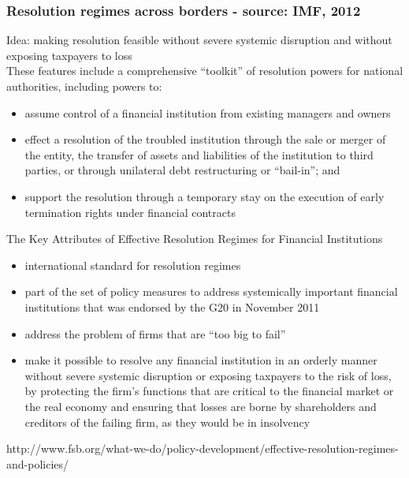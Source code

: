 \documentclass[11pt]{beamer}
\begin{document}
\begin{frame}
\frametitle{Resolution regimes across borders - source: IMF, 2012}
Idea: making resolution feasible without severe systemic disruption and without exposing taxpayers to loss\\
These features include a comprehensive “toolkit” of resolution powers for national authorities, including powers to:
\begin{itemize}
\item assume control of a financial institution from existing managers and owners
\item effect a resolution of the troubled institution through the sale or merger of the entity, the transfer of assets and liabilities of the institution to third parties, or through unilateral debt restructuring or “bail-in”; and
\item support the resolution through a temporary stay on the execution of early termination rights under financial contracts

\end{itemize}
\end{frame}

\begin{frame}
The Key Attributes of Effective Resolution Regimes for Financial Institutions
\begin{itemize}
\item international standard for resolution regimes
\item part of the set of policy measures to address systemically important financial institutions that was endorsed by the G20 in November 2011
\item address the problem of firms that are “too big to fail”
\item make it possible to resolve any financial institution in an orderly manner without severe systemic disruption or exposing taxpayers to the risk of loss, by protecting the firm’s functions that are critical to the financial market or the real economy and ensuring that losses are borne by shareholders and creditors of the failing firm, as they would be in insolvency
\end{itemize}
\tiny{http://www.fsb.org/what-we-do/policy-development/effective-resolution-regimes-and-policies/}
\end{frame}
\end{document}
